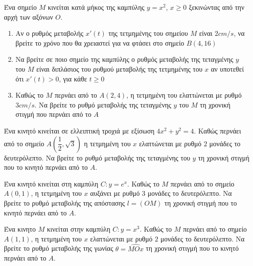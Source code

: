 \documentclass{presentation}
\begin{document}
\begin{askisi}
  Ένα σημείο $Μ$ κινείται κατά μήκος της καμπύλης $y=x^2$, $x\ge0$ ξεκινώντας από την αρχή των αξόνων $Ο$.
  \begin{enumerate}
    \item<1-> Αν ο ρυθμός μεταβολής $x'(t)$ της τετμημένης του σημείου $Μ$ είναι $2cm/s$, να βρείτε το χρόνο που θα χρειαστεί για να φτάσει στο σημείο $Β(4,16)$
    \item<2-> Να βρείτε σε ποιο σημείο της καμπύλης ο ρυθμός μεταβολής της τεταγμένης $y$ του $Μ$ είναι διπλάσιος του ρυθμού μεταβολής της τετμημένης του $x$ αν υποτεθεί ότι $x'(t)>0$, για κάθε $t\ge0$
    \item<3-> Καθώς το $Μ$ περνάει από το $Α(2,4)$, η τετμημένη του ελαττώνεται με ρυθμό $3cm/s$. Να βρείτε το ρυθμό μεταβολής της τεταγμένης $y$ του $Μ$ τη χρονική στιγμή που περνάει από το $Α$
  \end{enumerate}

\end{askisi}

\begin{askisi}
  Ένα κινητό κινείται σε ελλειπτική τροχιά με εξίσωση $4x^2+y^2=4$. Καθώς περνάει από το σημείο $Α(\dfrac{1}{2},\sqrt{3})$ η τετμημένη του $x$ ελαττώνεται με ρυθμό $2$ μονάδες το δευτερόλεπτο. Να βρείτε το ρυθμό μεταβολής της τεταγμένης του $y$ τη χρονική στιγμή που το κινητό περνάει από το $Α$.

\end{askisi}

\begin{askisi}
  Ένα κινητό κινείται στη καμπύλη $C:y=e^x$. Καθώς το $Μ$ περνάει από το σημείο $Α(0,1)$, η τετμημένη του $x$ αυξάνει με ρυθμό $3$ μονάδες το δευτερόλεπτο. Να βρείτε το ρυθμό μεταβολής της απόστασης $l=(ΟΜ)$ τη χρονική στιγμή που το κινητό περνάει από το $Α$.

\end{askisi}

\begin{askisi}
  Ένα κινητο $Μ$ κινείται στην καμπύλη $C:y=x^3$. Καθώς το $Μ$ περνάει από το σημείο $Α(1,1)$, η τετμημένη του $x$ ελαττώνεται με ρυθμό $2$ μονάδες το δευτερόλεπτο. Να βρείτε το ρυθμό μεταβολής της γωνίας $θ=\hat{ΜΟx}$ τη χρονική στιγμή που το κινητό περνάει από το $Α$.

\end{askisi}
\end{document}
